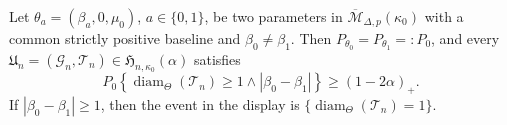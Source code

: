 Let \(\theta_a=(\beta_a,0,\mu_0)\), \(a\in\{0,1\}\), be two parameters in \(\overline{\mathcal M}_{\Delta,p}(\kappa_0)\) with a common strictly positive baseline and \(\beta_0\neq\beta_1\). Then \(P_{\theta_0}=P_{\theta_1}=:P_0\), and every \(\mathfrak U_n=(\mathcal G_n,\mathcal T_n)\in\mathfrak H_{n,\kappa_0}(\alpha)\) satisfies
\[
 P_0\!\left\{\operatorname{diam}_{\Theta}(\mathcal T_n)\geq1\wedge|\beta_0-\beta_1|\right\}\geq(1-2\alpha)_+.
\]
If \(|\beta_0-\beta_1|\geq1\), then the event in the display is \(\{\operatorname{diam}_{\Theta}(\mathcal T_n)=1\}\).